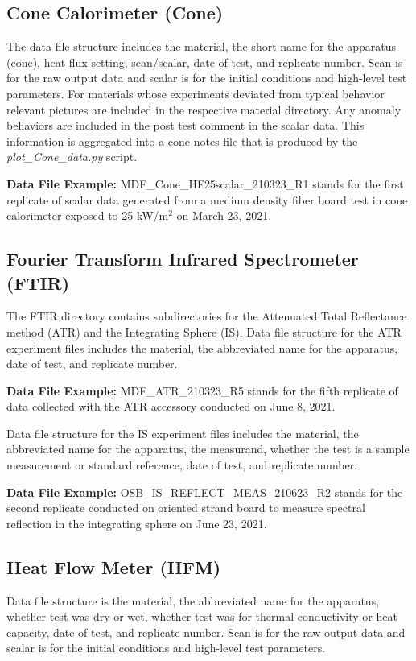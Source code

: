 \documentclass[12pt,oneside]{book}
\begin{document}
\subsection{Cone Calorimeter (Cone)}
The data file structure includes the material, the short name for the apparatus (cone), heat flux setting, scan/scalar, date of test, and replicate number. Scan is for the raw output data and scalar is for the initial conditions and high-level test parameters. For materials whose experiments deviated from typical behavior relevant pictures are included in the respective material directory. Any anomaly behaviors are included in the post test comment in the scalar data. This information is aggregated into a cone notes file that is produced by the {\em plot\_Cone\_data.py} script.

{\bf Data File Example:} MDF\_Cone\_HF25scalar\_210323\_R1 stands for the first replicate of scalar data generated from a medium density fiber board test in cone calorimeter exposed to 25 kW/m$^2$ on March 23, 2021.

\subsection{Fourier Transform Infrared Spectrometer (FTIR)}
The FTIR directory contains subdirectories for the Attenuated Total Reflectance method (ATR) and the Integrating Sphere (IS). Data file structure for the ATR experiment files includes the material, the abbreviated name for the apparatus, date of test, and replicate number.

{\bf Data File Example:} MDF\_ATR\_210323\_R5 stands for the fifth replicate of data collected with the ATR accessory conducted on June 8, 2021.

Data file structure for the IS experiment files includes the material, the abbreviated name for the apparatus, the measurand, whether the test is a sample measurement or standard reference, date of test, and replicate number.

{\bf Data File Example:} OSB\_IS\_REFLECT\_MEAS\_210623\_R2 stands for the second replicate conducted on oriented strand board to measure spectral reflection in the integrating sphere on June 23, 2021.

\subsection{Heat Flow Meter (HFM)}
Data file structure is the material, the abbreviated name for the apparatus, whether test was dry or wet, whether test was for thermal conductivity or heat capacity, date of test, and replicate number. Scan is for the raw output data and scalar is for the initial conditions and high-level test parameters.
\end{document}
